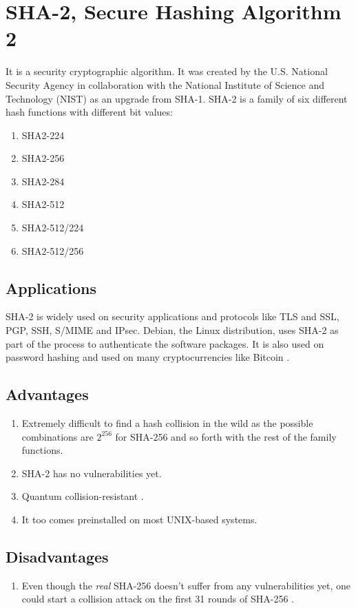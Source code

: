 \documentclass[]{article}
\begin{document}
\section{SHA-2, Secure Hashing Algorithm 2}
It is a security cryptographic algorithm. It was created by the U.S. National Security Agency in collaboration with the National Institute of Science and Technology (NIST) as an upgrade from SHA-1. SHA-2 is a family of six different hash functions with different bit values:
\begin{enumerate}
	\item SHA2-224
	\item SHA2-256
	\item SHA2-284
	\item SHA2-512
	\item SHA2-512/224
	\item SHA2-512/256
\end{enumerate}

\subsection{Applications}
SHA-2 is widely used on security applications and protocols like TLS and SSL, PGP, SSH, S/MIME and IPsec. Debian, the Linux distribution, uses SHA-2 as part of the process to authenticate the software packages. It is also used on password hashing \cite{UnixCryptSHA256} and used on many cryptocurrencies like Bitcoin \cite{nakamotoBitcoinPeertoPeerElectronic}.

\subsection{Advantages}
\begin{enumerate}
	\item Extremely difficult to find a hash collision in the wild as the possible combinations are $2^{256}$ for SHA-256 and so forth with the rest of the family functions.
	\item SHA-2 has no vulnerabilities yet.
	\item Quantum collision-resistant \cite{unruhCollapseBindingQuantumCommitments2016}. 
	\item It too comes preinstalled on most UNIX-based systems.
\end{enumerate}

\subsection{Disadvantages}
\begin{enumerate}
	\item Even though the \textit{real} SHA-256 doesn't suffer from any vulnerabilities yet, one could start a collision attack on the first 31 rounds of SHA-256 \cite{mendelImprovingLocalCollisions2013}.
\end{enumerate}
\end{document}
